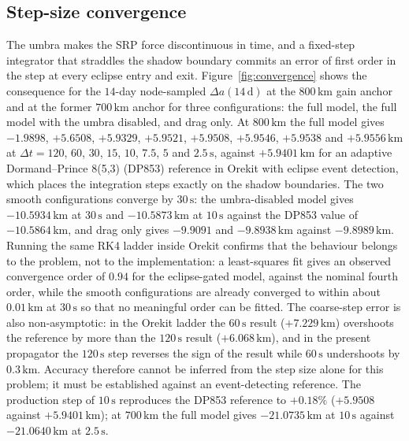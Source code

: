 \subsection{Step-size convergence}
\label{sec:val_convergence}
\noindent The umbra makes the SRP force discontinuous in time, and a fixed-step integrator that straddles the shadow boundary commits an error of first order in the step at every eclipse entry and exit. Figure~\ref{fig:convergence} shows the consequence for the \(14\)-day node-sampled \(\Delta a(14\,\mathrm{d})\) at the \(800\,\mathrm{km}\) gain anchor and at the former \(700\,\mathrm{km}\) anchor for three configurations: the full model, the full model with the umbra disabled, and drag only. At \(800\,\mathrm{km}\) the full model gives \(-1.9898\), \(+5.6508\), \(+5.9329\), \(+5.9521\), \(+5.9508\), \(+5.9546\), \(+5.9538\) and \(+5.9556\,\mathrm{km}\) at \(\Delta t = 120\), \(60\), \(30\), \(15\), \(10\), \(7.5\), \(5\) and \(2.5\,\mathrm{s}\), against \(+5.9401\,\mathrm{km}\) for an adaptive Dormand--Prince 8(5,3) (DP853) reference in Orekit with eclipse event detection, which places the integration steps exactly on the shadow boundaries. The two smooth configurations converge by \(30\,\mathrm{s}\): the umbra-disabled model gives \(-10.5934\,\mathrm{km}\) at \(30\,\mathrm{s}\) and \(-10.5873\,\mathrm{km}\) at \(10\,\mathrm{s}\) against the DP853 value of \(-10.5864\,\mathrm{km}\), and drag only gives \(-9.9091\) and \(-9.8938\,\mathrm{km}\) against \(-9.8989\,\mathrm{km}\). Running the same RK4 ladder inside Orekit confirms that the behaviour belongs to the problem, not to the implementation: a least-squares fit gives an observed convergence order of \(0.94\) for the eclipse-gated model, against the nominal fourth order, while the smooth configurations are already converged to within about \(0.01\,\mathrm{km}\) at \(30\,\mathrm{s}\) so that no meaningful order can be fitted. The coarse-step error is also non-asymptotic: in the Orekit ladder the \(60\,\mathrm{s}\) result (\(+7.229\,\mathrm{km}\)) overshoots the reference by more than the \(120\,\mathrm{s}\) result (\(+6.068\,\mathrm{km}\)), and in the present propagator the \(120\,\mathrm{s}\) step reverses the sign of the result while \(60\,\mathrm{s}\) undershoots by \(0.3\,\mathrm{km}\). Accuracy therefore cannot be inferred from the step size alone for this problem; it must be established against an event-detecting reference. The production step of \(10\,\mathrm{s}\) reproduces the DP853 reference to \(+0.18\%\) (\(+5.9508\) against \(+5.9401\,\mathrm{km}\)); at \(700\,\mathrm{km}\) the full model gives \(-21.0735\,\mathrm{km}\) at \(10\,\mathrm{s}\) against \(-21.0640\,\mathrm{km}\) at \(2.5\,\mathrm{s}\).


